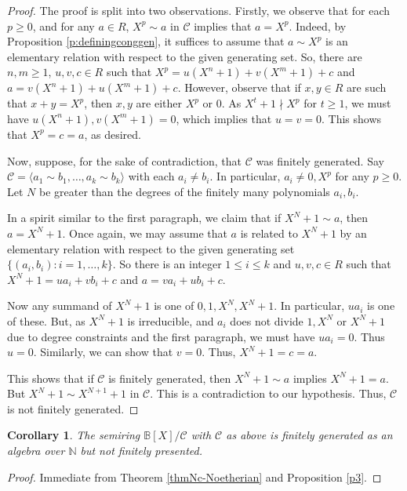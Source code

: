 \documentclass[notitlepage, 10pt]{article}
\theoremstyle{defin}
\theoremstyle{theo}
\newtheorem{cor}{Corollary}[defn]
\theoremstyle{rema}
\newcommand{\N}{\mathbb{N}}
\newcommand{\bB}{\mathbb{B}}
\newcommand{\cC}{\mathcal{C}}
\begin{document}
\begin{proof}
    The proof is split into two observations. Firstly, we observe that for each $p\geq 0$, and for any $a\in R$, $X^p\sim a$ in $\cC$ implies that $a=X^p$. Indeed, by Proposition \ref{p:definingconggen}, it suffices to assume that $a\sim X^p$ is an elementary relation with respect to the given generating set. So, there are $n,m\geq 1$, $u,v, c\in R$ such that $X^p = u(X^n+1)+v(X^m+1) + c$ and $a = v(X^n+1)+u(X^m+1)+c$. However, observe that if $x,y\in R$ are such that $x+y=X^p$, then $x,y$ are either $X^p$ or $0$. As $X^t+1 \nmid X^p$ for $t\geq 1$, we must have $u(X^n+1), v(X^m+1)=0$, which implies that $u=v=0$. This shows that $X^p = c = a$, as desired.
    
    Now, suppose, for the sake of contradiction, that $\cC$ was finitely generated. Say $\cC=\langle a_1\sim b_1,\ldots,a_k\sim b_k\rangle$ with each $a_i\neq b_i$. In particular, $a_i\neq 0, X^p$ for any $p\geq 0$. Let $N$ be greater than the degrees of the finitely many polynomials $a_i,b_i$.

    In a spirit similar to the first paragraph, we claim that if $X^N+1\sim a$, then $a=X^N+1$. Once again, we may assume that $a$ is related to $X^{N}+1$ by an elementary relation with respect to the given generating set $\{(a_i,b_i) : i=1,\ldots, k\}$. So there is an integer $1\leq i\leq k$ and $u,v,c\in R$ such that 
    $X^N+1 = ua_i+vb_i + c$ and $a = va_i+ub_i+c$.

    Now any summand of $X^N+1$ is one of $0,1, X^N, X^N+1$. In particular, $ua_i$ is one of these. But, as $X^N+1$ is irreducible, and $a_i$ does not divide $1, X^N$ or $X^{N}+1$ due to degree constraints and the first paragraph, we must have $ua_i=0$. Thus $u=0$. Similarly, we can show that $v=0$. Thus, $X^N+1 = c =a$. 
    
    This shows that if $\cC$ is finitely generated, then $X^N+1 \sim a$ implies $X^N+1 = a$. But $X^N+1 \sim X^{N+1}+1$ in $\cC$. This is a contradiction to our hypothesis. Thus, $\cC$ is not finitely generated. 
\end{proof}

\begin{cor}
     The semiring $\bB[X]/\cC$ with $\cC$ as above is finitely generated as an algebra over $\N$ but not finitely presented.
\end{cor}

\begin{proof}
    Immediate from Theorem \ref{thmNc-Noetherian} and Proposition \ref{p3}.
\end{proof}
\end{document}
